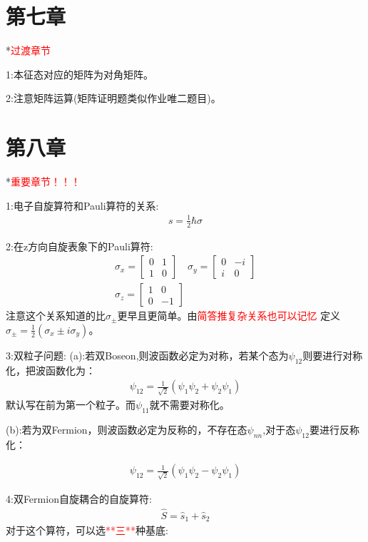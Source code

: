 \documentclass[10pt,journal,compsoc]{IEEEtran}
\begin{document}
\section{第七章}
*\textcolor{red}{过渡章节}

1:本征态对应的矩阵为对角矩阵。

2:注意矩阵运算(矩阵证明题类似作业唯二题目)。

\section{第八章}
*\textcolor{red}{重要章节！！！}

1:电子自旋算符和Pauli算符的关系:
\begin{align}
  s=\frac12\hbar\sigma
\end{align}

2:在z方向自旋表象下的Pauli算符:
\begin{align}
  \sigma_x=\begin{bmatrix}0&1\\1&0\end{bmatrix}\quad
  \sigma_y=\begin{bmatrix}0&-i\\i&0\end{bmatrix}\\
  \sigma_z=\begin{bmatrix}1&0\\0&-1\end{bmatrix}
\end{align}注意这个关系知道的比$\sigma_{\pm}$更早且更简单。由\textcolor{red}{简答推复杂关系也可以记忆}
定义$\sigma_{\pm}=\frac12(\sigma_x\pm i \sigma_y)$。

3:双粒子问题:
(a):若双Boseon,则波函数必定为对称，若某个态为$\psi_{12}$则要进行对称化，把波函数化为：\begin{align}
  \psi_{12}=\frac1{\sqrt{2}}(\psi_1\psi_2+\psi_2\psi_1)
\end{align}默认写在前为第一个粒子。而$\psi_{11}$就不需要对称化。

(b):若为双Fermion，则波函数必定为反称的，不存在态$\psi_{nn}$,对于态$\psi_{12}$要进行反称化：

\begin{align}
  \psi_{12}=\frac1{\sqrt{2}}(\psi_1\psi_2-\psi_2\psi_1 )
\end{align}

4:双Fermion自旋耦合的自旋算符:\begin{align}\hat S=\hat s_1+\hat s_2\end{align}对于这个算符，可以选\textcolor{red}{**三**}种基底:
\end{document}
